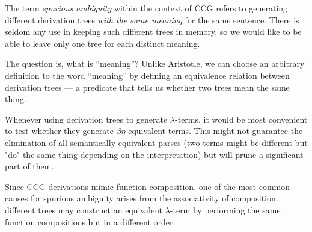 \documentclass[main.tex]{subfiles}
\begin{document}
The term \emph{spurious ambiguity} within the context of CCG refers to generating
different derivation trees \emph{with the same meaning} for the same sentence. There
is seldom any use in keeping such different trees in memory, so we would like
to be able to leave only one tree for each distinct meaning.

The question is, what is ``meaning''? Unlike Aristotle, we can choose an arbitrary
definition to the word ``meaning'' by defining an equivalence relation between
derivation trees --- a predicate that tells us whether two trees mean the same
thing.

Whenever using derivation trees to generate $\lambda$-terms, it would be most
convenient to test whether they generate $\beta\eta$-equivalent terms. This might
not guarantee the elimination of all semantically equivalent parses (two terms
might be different but "do" the same thing depending on the interpretation)
but will prune a significant part of them.

Since CCG derivations mimic function composition, one of the most common causes
for spurious ambiguity arises from the associativity of composition: different
trees may construct an equivalent $\lambda$-term by performing the same function
compositions but in a different order.
\end{document}
